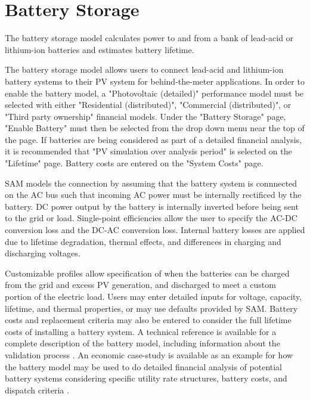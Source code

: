 \documentclass[12pt,letterpaper]{article}
\begin{document}
\chapter{Battery Storage}\label{battery}

The battery storage model calculates power to and from a bank of lead-acid or lithium-ion batteries and estimates battery lifetime.

The battery storage model allows users to connect lead-acid and lithium-ion battery systems to their PV system for behind-the-meter applications.  In order to enable the battery model, a "Photovoltaic (detailed)" performance model must be selected with either "Residential (distributed)", "Commercial (distributed)", or "Third party ownership" financial models.  Under the "Battery Storage" page, "Enable Battery" must then be selected from the drop down menu near the top of the page.  If batteries are being considered as part of a detailed financial analysis, it is recommended that "PV simulation over analysis period" is selected on the "Lifetime" page.  Battery costs are entered on the "System Costs" page.

SAM models the connection by assuming that the battery system is connnected on the AC bus such that incoming AC power must be internally rectificed by the battery.  DC power output by the battery is internally inverted before being sent to the grid or load.  Single-point efficiencies allow the user to specify the AC-DC conversion loss and the DC-AC conversion loss.  Internal battery losses are applied due to lifetime degradation, thermal effects, and differences in charging and discharging voltages.

Customizable profiles allow specification of when the batteries can be charged from the grid and excess PV generation, and discharged to meet a custom portion of the electric load.  Users may enter detailed  inputs for voltage, capacity, lifetime, and thermal properties, or may use defaults provided by SAM.   Battery costs and replacement criteria may also be entered to consider the full lifetime costs of installing a battery system. A technical reference is available for a complete description of the battery model, including information about the validation process \citep{diorio2015a}. An economic case-study  is available as an example for how the battery model may be used to do detailed financial analysis of potential battery systems considering specific utility rate structures, battery costs, and dispatch criteria \citep{diorio2015b}.
\end{document}
